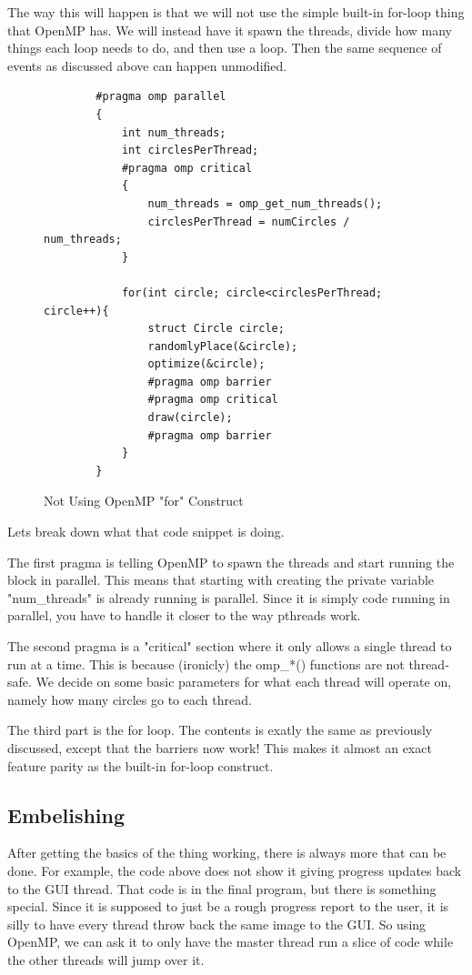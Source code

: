 \documentclass[12pt]{article}
\begin{document}
The way this will happen is that we will not use the simple built-in for-loop thing that OpenMP has.
We will instead have it spawn the threads, divide how many things each loop needs to do, and then use a loop.
Then the same sequence of events as discussed above can happen unmodified.

\begin{figure}[htb]
	\centering
	\begin{verbatim}
		#pragma omp parallel
		{
			int num_threads;
			int circlesPerThread;
			#pragma omp critical
			{
				num_threads = omp_get_num_threads();
				circlesPerThread = numCircles / num_threads;
			}

			for(int circle; circle<circlesPerThread; circle++){
				struct Circle circle;
				randomlyPlace(&circle);
				optimize(&circle);
				#pragma omp barrier
				#pragma omp critical
				draw(circle);
				#pragma omp barrier
			}
		}
	\end{verbatim}
	\caption{Not Using OpenMP "for" Construct}
\end{figure}

Lets break down what that code snippet is doing.

The first pragma is telling OpenMP to spawn the threads and start running the block in parallel.
This means that starting with creating the private variable "num\_threads" is already running is parallel.
Since it is simply code running in parallel, you have to handle it closer to the way pthreads work.

The second pragma is a "critical" section where it only allows a single thread to run at a time.
This is because (ironicly) the omp\_*() functions are not thread-safe.
We decide on some basic parameters for what each thread will operate on, namely how many circles go to each thread.

The third part is the for loop.
The contents is exatly the same as previously discussed, except that the barriers now work!
This makes it almost an exact feature parity as the built-in for-loop construct.

\subsection{Embelishing}

After getting the basics of the thing working, there is always more that can be done.
For example, the code above does not show it giving progress updates back to the GUI thread.
That code is in the final program, but there is something special.
Since it is supposed to just be a rough progress report to the user, it is silly to have every thread throw back the same image to the GUI.
So using OpenMP, we can ask it to only have the master thread run a slice of code while the other threads will jump over it.
\end{document}
